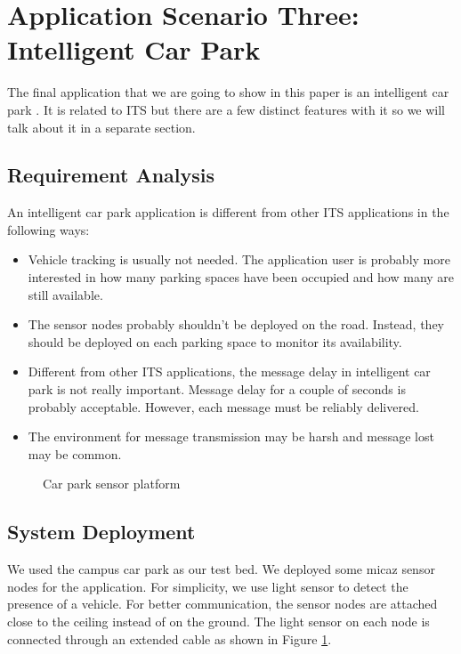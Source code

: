 \section{Application Scenario Three: Intelligent Car Park}
The final application that we are going to show in this paper is an intelligent car park \cite{tang:carpark}. It is related to ITS but there are a few distinct features with it so we will talk about it in a separate section.

\subsection{Requirement Analysis}
An intelligent car park application is different from other ITS applications in the following ways:
\begin{itemize}
\item Vehicle tracking is usually not needed. The application user is probably more interested in how many parking spaces have been occupied and how many are still available.
\item The sensor nodes probably shouldn't be deployed on the road. Instead, they should be deployed on each parking space to monitor its availability.
\item Different from other ITS applications, the message delay in intelligent car park is not really important. Message delay for a couple of seconds is probably acceptable. However, each message must be reliably delivered.
\item The environment for message transmission may be harsh and message lost may be common.
\end{itemize}

\begin{figure}
\centering
{}
\caption{Car park sensor platform}
\label{fig:carParkSensor}
\end{figure}

\subsection{System Deployment}
We used the campus car park as our test bed. We deployed some micaz sensor nodes for the application. For simplicity, we use light sensor to detect the presence of a vehicle. For better communication, the sensor nodes are attached close to the ceiling instead of on the ground. The light sensor on each node is connected through an extended cable as shown in Figure \ref{fig:carParkSensor}. 


